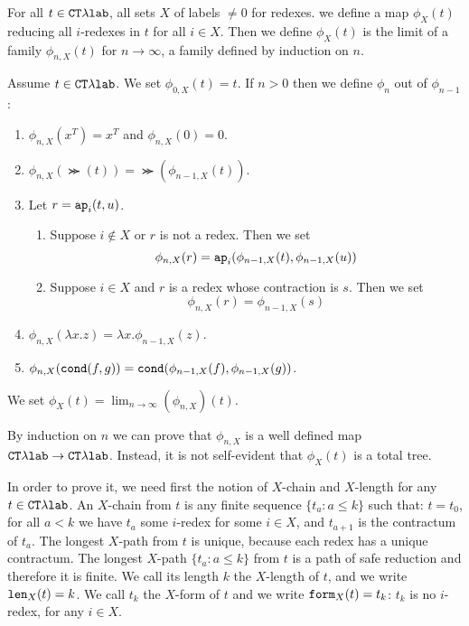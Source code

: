 
For all $t \in { { {\tt CT}\lambda} \mbox{\tt lab}}$, all sets $X$ of labels $\not = 0$ for redexes.
we define a map  $\phi_X(t)$ reducing all $i$-redexes in $t$ for all $i \in X$. 
Then we define $\phi_X(t)$ is the limit of a family $\phi_{n,X}(t)$ for $n \rightarrow \infty$, 
a family defined by induction on $n$.


\begin{definition}
Assume $t \in { { {\tt CT}\lambda} \mbox{\tt lab}}$.
We set $\phi_{0,X}(t)=t$. If $n >0$ then we define $\phi_n$ out of $\phi_{n-1}$:
\begin{enumerate} 

\item
$\phi_{n,X}(x^T)=x^T$ and $\phi_{n,X}(0)=0$.

\item
$\phi_{n,X}(\Succ(t)) = \Succ(\phi_{n-1,X}(t))$. 

\item
Let $r = {\tt ap}_i(t,u)$. 
\begin{enumerate} 
\item
Suppose $i \not \in X$ or $r$ is not a redex. Then we set
$$\phi_{n,X}(r) = {\tt ap}_i(\phi_{n-1,X}(t),\phi_{n-1,X}(u))$$
\item
Suppose $i \in X$ and $r$ is a redex whose contraction is $s$. Then we set
$$\phi_{n,X}(r) = \phi_{n-1,X}(s)$$
\end{enumerate}

\item
$\phi_{n,X}(\lambda x.z) = \lambda x.\phi_{n-1,X}(z)$.

\item
$\phi_{n,X}({\tt cond}(f,g)) = {\tt cond}(\phi_{n-1,X}(f), \phi_{n-1,X}(g))$.

\end{enumerate}

We set $\phi_X(t) = \lim_{n \rightarrow \infty}(\phi_{n,X})(t)$.
\end{definition}


By induction on $n$ we can prove that 
$\phi_{n,X}$ is a well defined map ${{ {\tt CT}\lambda}\mbox{\tt lab}} \rightarrow { { {\tt CT}\lambda} \mbox{\tt lab}}$.
Instead, it is not self-evident that $\phi_X(t)$ is a total tree.

In order to prove it, we need first the notion of $X$-chain and $X$-length for any $t \in { { {\tt CT}\lambda} \mbox{\tt lab}}$.
An $X$-chain from $t$ is any finite sequence $\{t_a : a \le k\}$ such that: 
$t=t_0$, for all $a<k$ we have $t_a$ some $i$-redex for some $ i \in X$, and $t_{a+1}$ is the contractum
of $t_a$. The longest $X$-path from $t$ is unique, because each redex has a unique contractum. 
The longest $X$-path $\{t_a : a \le k\}$ 
from $t$ is a path of safe reduction and therefore it is finite. We call its length $k$ the
$X$-length of $t$, and we write ${\tt len}_X(t) = k$. We call $t_k$ the $X$-form of $t$ and we
write ${\tt form}_X(t) = t_k$: $t_k$ is no $i$-redex, for any $i \in X$.



